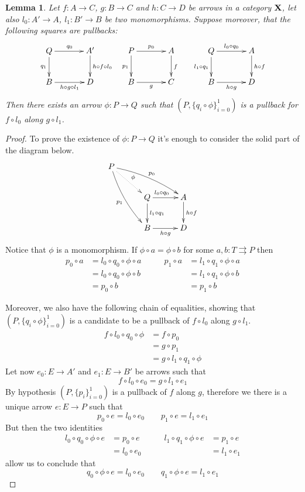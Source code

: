 \documentclass[a4paper]{article}
\def\X{\textbf {\textup{X}}}
\newtheorem{lemma}[theorem]{Lemma}
\theoremstyle{definition}
\begin{document}
	
	\begin{lemma}\label{lem:cond} Let $f\colon A\to C$, $g\colon B\to C$ and $h\colon C\to D$ be arrows in a category $\X$, let also $l_0\colon A'\to A$, $l_1\colon B'\to B$ be two monomorphisms. Suppose moreover, that the following squares are pullbacks:
		\[\xymatrix@C=35pt{Q \ar[r]^{q_0} \ar[d]_{q_1} & A' \ar[d]^{h\circ f\circ l_0} & P \ar[r]^{p_0} \ar[d]_{p_1} & A \ar[d]^{f} & Q  \ar[r]^{l_0\circ q_0} \ar[d]_{l_1\circ q_1}& A \ar[d]^{h\circ f}\\ B \ar[r]_{h\circ g\circ l_1} &D& B \ar[r]_{g}& C &  B \ar[r]_{h\circ g} & D}\]
		Then there exists an arrow $\phi\colon P\to Q$ such that $(P, \{q_i\circ \phi\}_{i=0}^1)$ is a pullback for $f\circ l_0$ along $g\circ l_1$.
	\end{lemma} 
	\begin{proof}
To prove the existence of $\phi\colon P\to Q$ it's enough to consider the solid part of the diagram below.
\[\xymatrix@C=30pt{P \ar@{.>}[dr]^{\phi} \ar@/^.2cm/[drr]^{p_0} \ar@/_.2cm/[ddr]_{p_1}\\ & Q  \ar[r]^(.4){l_0\circ q_0} \ar[d]^{l_1\circ q_1}& A \ar[d]^{h\circ f} \\ &B \ar[r]_{h\circ g} & D}\]
Notice that $\phi$ is a monomorphism. If $\phi\circ a=\phi \circ b$ for some $a,b\colon T\rightrightarrows P$ then
\[\begin{split}
	p_0\circ a&=l_0\circ q_0\circ \phi \circ a\\&=l_0\circ q_0\circ \phi \circ b\\&=p_0\circ b
\end{split} \qquad \begin{split}
p_1\circ a&=l_1\circ q_1\circ \phi \circ a\\&=l_1\circ q_1\circ \phi \circ b\\&=p_1\circ b
\end{split} \]

Moreover, we also have the following chain of equalities, showing that  $(P, \{q_i\circ \phi\}_{i=0}^1)$  is a candidate to be a pullback of $f\circ l_0$ along $g\circ l_1$.
\begin{align*}
f\circ l_0\circ q_0\circ \phi &=f\circ p_0\\&=g\circ p_1\\&=g\circ l_1\circ q_1\circ \phi 
\end{align*}
Let now $e_0\colon E\to A'$ and $e_1\colon E\to B'$ be arrows such that 
\[f\circ l_0\circ e_0=g\circ l_1\circ e_1\]
By hypothesis $(P, \{p_i\}_{i=0}^1)$ is a pullback of $f$ along $g$, therefore we there is a unique  arrow $e\colon E\to P$ such that
\[p_0\circ e = l_0\circ e_0 \qquad p_1\circ e=l_1\circ e_1\]
But then the two identities
\[\begin{split}
	l_0\circ q_0\circ \phi\circ e&=p_0\circ e\\& =l_0\circ e_0 \end{split} \qquad \begin{split}l_1\circ q_1\circ \phi\circ e&=p_1\circ e\\& =l_1\circ e_1
\end{split}\]
allow us to conclude that 
\[q_0\circ \phi\circ e=l_0\circ e_0 \qquad q_1\circ \phi\circ e=l_1\circ e_1\]
	

\end{proof}
\end{document}
